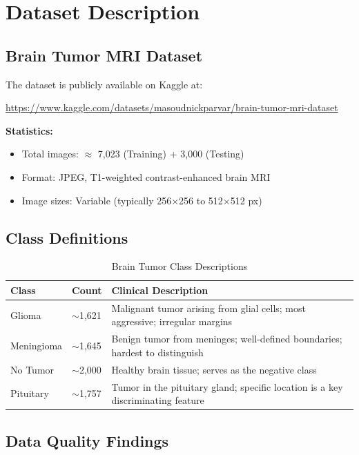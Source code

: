 \documentclass[12pt,a4paper]{article}
\begin{document}
\section{Dataset Description}

\subsection{Brain Tumor MRI Dataset}

The dataset is publicly available on Kaggle at:
\begin{center}
\url{https://www.kaggle.com/datasets/masoudnickparvar/brain-tumor-mri-dataset}
\end{center}

\noindent\textbf{Statistics:}
\begin{itemize}[noitemsep]
    \item Total images: $\approx$ 7,023 (Training) + 3,000 (Testing)
    \item Format: JPEG, T1-weighted contrast-enhanced brain MRI
    \item Image sizes: Variable (typically 256×256 to 512×512 px)
\end{itemize}

\subsection{Class Definitions}

\begin{table}[H]
\centering
\caption{Brain Tumor Class Descriptions}
\begin{tabular}{@{}llp{7cm}@{}}
\toprule
\textbf{Class} & \textbf{Count} & \textbf{Clinical Description} \\
\midrule
Glioma     & $\sim$1,621 & Malignant tumor arising from glial cells; most aggressive; irregular margins \\
Meningioma & $\sim$1,645 & Benign tumor from meninges; well-defined boundaries; hardest to distinguish \\
No Tumor   & $\sim$2,000 & Healthy brain tissue; serves as the negative class \\
Pituitary  & $\sim$1,757 & Tumor in the pituitary gland; specific location is a key discriminating feature \\
\bottomrule
\end{tabular}
\end{table}

\subsection{Data Quality Findings}
\end{document}
